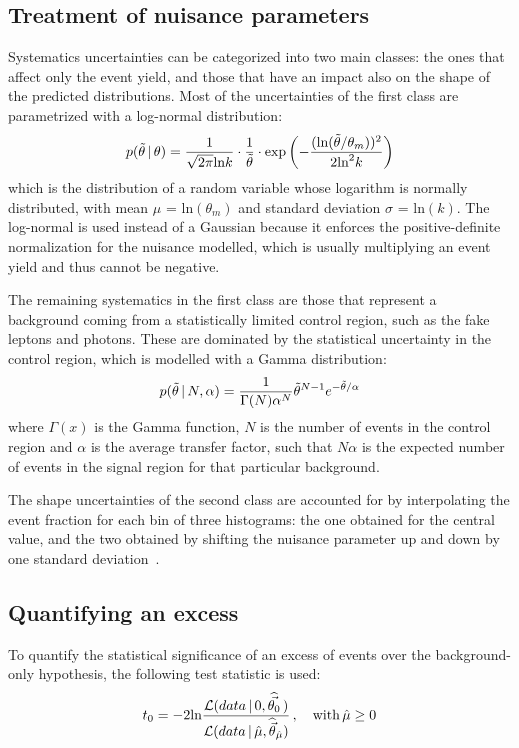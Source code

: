 \subsection{Treatment of nuisance parameters}
Systematics uncertainties can be categorized into two main classes: the ones that affect only the event yield, and those that have an impact also on the shape of the predicted distributions.
Most of the uncertainties of the first class are parametrized with a log-normal distribution:
\begin{equation}
  \label{eq:lnNdef}
  p(\tilde{\theta}\,|\,\theta) = \frac{1}{\sqrt{2 \pi} \text{ln} k} \cdot \frac{1}{\tilde{\theta}} \cdot \text{exp} \left( -\frac{(\text{ln}(\tilde{\theta}/\theta_m))^2}{2 \text{ln}^2 k} \right)
\end{equation}
which is the distribution of a random variable whose logarithm is normally distributed, with mean $\mu$ = $\text{ln}(\theta_m)$ and standard deviation $\sigma$ = $\text{ln}(k)$.
The log-normal is used instead of a Gaussian because it enforces the positive-definite normalization for the nuisance modelled, which is usually multiplying an event yield and thus cannot be negative.

The remaining systematics in the first class are those that represent a background coming from a statistically limited control region, such as the fake leptons and photons.
These are dominated by the statistical uncertainty in the control region, which is modelled with a Gamma distribution:
\begin{equation}
  \label{eq:gammadef}
  p(\tilde{\theta}\,|\,N,\alpha) = \frac{1}{\Gamma(N) \alpha^N} \tilde{\theta}^{N-1} e^{-\tilde{\theta}/\alpha}
\end{equation}
where $\Gamma(x)$ is the Gamma function,
$N$ is the number of events in the control region and $\alpha$ is the average transfer factor,
such that $N \alpha$ is the expected number of events in the signal region for that particular background.

The shape uncertainties of the second class are accounted for by interpolating the event fraction for each bin of three histograms:
the one obtained for the central value, and the two obtained by shifting the nuisance parameter up and down by one standard deviation~\cite{CMS-CAT-23-001}.

\subsection{Quantifying an excess}
To quantify the statistical significance of an excess of events over the background-only hypothesis, the following test statistic is used:
\begin{equation}
  \label{eq:test_statistic}
  t_0 = -2\text{ln} \frac {\mathcal{L}(data\,|\,0,\widehat{\vec{\theta_0}}\,)} {\mathcal{L}(data\,|\,\hat\mu,\widehat{\vec\theta}_{\hat\mu})}\,,\quad \text{with}\, \hat\mu \ge 0
\end{equation}

